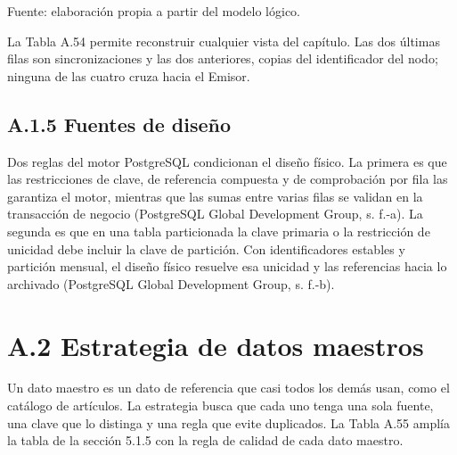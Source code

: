 \documentclass[11pt]{article}
\begin{document}
{\raggedright Fuente: elaboración propia a partir del modelo lógico.\par}


La Tabla A.54 permite reconstruir cualquier vista del capítulo. Las dos últimas filas son sincronizaciones y las dos anteriores, copias del identificador del nodo; ninguna de las cuatro cruza hacia el Emisor.

\subsection{A.1.5 Fuentes de diseño}

Dos reglas del motor PostgreSQL condicionan el diseño físico. La primera es que las restricciones de clave, de referencia compuesta y de comprobación por fila las garantiza el motor, mientras que las sumas entre varias filas se validan en la transacción de negocio (PostgreSQL Global Development Group, s. f.-a). La segunda es que en una tabla particionada la clave primaria o la restricción de unicidad debe incluir la clave de partición. Con identificadores estables y partición mensual, el diseño físico resuelve esa unicidad y las referencias hacia lo archivado (PostgreSQL Global Development Group, s. f.-b).

\section{A.2 Estrategia de datos maestros}

Un dato maestro es un dato de referencia que casi todos los demás usan, como el catálogo de artículos. La estrategia busca que cada uno tenga una sola fuente, una clave que lo distinga y una regla que evite duplicados. La Tabla A.55 amplía la tabla de la sección 5.1.5 con la regla de calidad de cada dato maestro.
\end{document}
